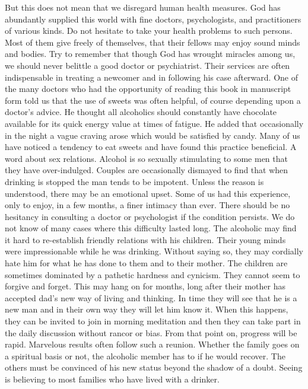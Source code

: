 \begin{biblechapter}
But this does not mean that we disregard human health measures.  God has abundantly supplied this world with fine doctors, psychologists, and practitioners of various kinds.  Do not hesitate to take your health problems to such persons.  Most of them give freely of themselves, that their fellows may enjoy sound minds and bodies.  Try to remember that though God has wrought miracles among us, we should never belittle a good doctor or psychiatrist.  Their services are often indispensable in treating a newcomer and in following his case afterward.
One of the many doctors who had the opportunity of reading this book in manuscript form told us that the use of sweets was often helpful, of course depending upon a doctor's advice.  He thought all alcoholics should constantly have chocolate available for its quick energy value at times of fatigue.  He added that occasionally in the night a vague craving arose which would be satisfied by candy.  Many of us have noticed a tendency to eat sweets and have found this practice beneficial.
A word about sex relations.  Alcohol is so sexually stimulating to some men that they have over-indulged.  Couples are occasionally dismayed to find that when drinking is stopped the man tends to be impotent.  Unless the reason is understood, there may be an emotional upset.  Some of us had this experience, only to enjoy, in a few months, a finer intimacy than ever.  There should be no hesitancy in consulting a doctor or psychologist if the condition persists.  We do not know of many cases where this difficulty lasted long.
The alcoholic may find it hard to re-establish friendly relations with his children.  Their young minds were impressionable while he was drinking.  Without saying so, they may cordially hate him for what he has done to them and to their mother.  The children are sometimes dominated by a pathetic hardness and cynicism.  They cannot seem to forgive and forget. This may hang on for months, long after their mother has accepted dad's new way of living and thinking.
In time they will see that he is a new man and in their own way they will let him know it.  When this happens, they can be invited to join in morning meditation and then they can take part in the daily discussion without rancor or bias.  From that point on, progress will be rapid.  Marvelous results often follow such a reunion.
Whether the family goes on a spiritual basis or not, the alcoholic member has to if he would recover.  The others must be convinced of his new status beyond the shadow of a doubt.  Seeing is believing to most families who have lived with a drinker.

\end{biblechapter}
